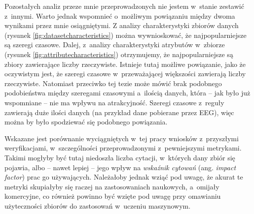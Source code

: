Pozostałych analiz przeze mnie przeprowadzonych nie jestem w~stanie zestawić z~innymi.
Warto jednak wspomnieć o~możliwym powiązaniu między dwoma wynikami przez mnie osiągniętymi.
Z analizy charakterystyki zbiorów danych (rysunek \ref{fig:datasetcharacteristics}) można wywnioskować, że najpopularniejsze są szeregi czasowe.
Dalej, z~analizy charakterystyki atrybutów w~zbiorze (rysunek \ref{fig:attributecharacteristics}) otrzymujemy, że najpopularniejsze są zbiory zawierające liczby rzeczywiste.
Istnieje tutaj możliwe powiązanie, jako że oczywistym jest, że szeregi czasowe w~przeważającej większości zawierają liczby rzeczywiste.
Natomiast przeciwko tej tezie może mówić brak podobnego podobieństwa między szeregami czasowymi a~ilością danych, która -- jak było już wspomniane -- nie ma wpływu na atrakcyjność.
Szeregi czasowe z~reguły zawierają duże ilości danych (na przykład dane pobierane przez EEG), więc można by było spodziewać się podobnego powiązania.

Wskazane jest porównanie wyciągniętych w~tej pracy wniosków z~przyszłymi weryfikacjami, w~szczególności przeprowadzonymi z~pewniejszymi metrykami.
Takimi mogłyby być tutaj niedoszła liczba cytacji, w~których dany zbiór się pojawia, albo -- nawet lepiej -- jego wpływ na \emph{wskaźnik cytowań} (ang. \emph{impact factor}) prac go używających.
Należałoby jednak wziąć pod uwagę, że akurat te metryki skupiałyby się raczej na zastosowaniach naukowych, a~omijały komercyjne, co również powinno być wzięte pod uwagę przy omawianiu użyteczności zbiorów do zastosowań w~uczeniu maszynowym.

